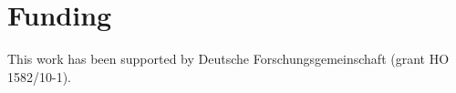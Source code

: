 \documentclass{bioinfo}
\begin{document}



\section*{Funding}

This work has been supported by Deutsche Forschungsgemeinschaft (grant HO 1582/10-1).\vspace*{-12pt}


%
%
%
%
%
%
%

\end{document}
